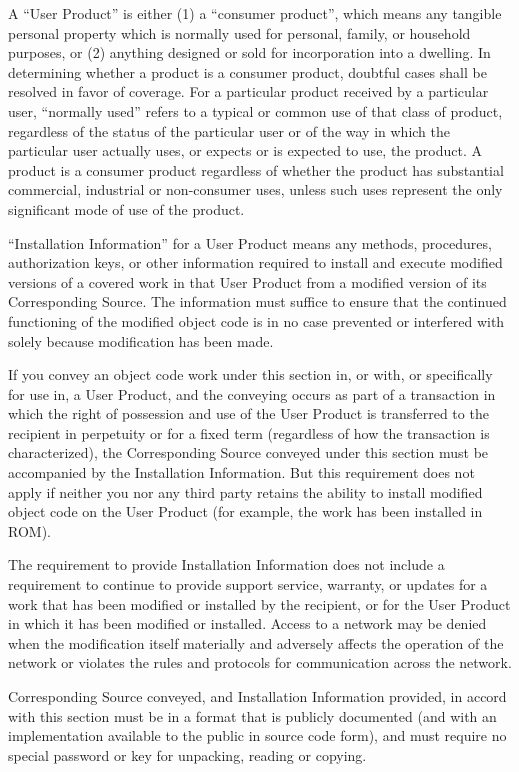 \begin{enumerate}
A ``User Product'' is either (1) a ``consumer product'', which means any
tangible personal property which is normally used for personal, family,
or household purposes, or (2) anything designed or sold for incorporation
into a dwelling.  In determining whether a product is a consumer product,
doubtful cases shall be resolved in favor of coverage.  For a particular
product received by a particular user, ``normally used'' refers to a
typical or common use of that class of product, regardless of the status
of the particular user or of the way in which the particular user
actually uses, or expects or is expected to use, the product.  A product
is a consumer product regardless of whether the product has substantial
commercial, industrial or non-consumer uses, unless such uses represent
the only significant mode of use of the product.

``Installation Information'' for a User Product means any methods,
procedures, authorization keys, or other information required to install
and execute modified versions of a covered work in that User Product from
a modified version of its Corresponding Source.  The information must
suffice to ensure that the continued functioning of the modified object
code is in no case prevented or interfered with solely because
modification has been made.

If you convey an object code work under this section in, or with, or
specifically for use in, a User Product, and the conveying occurs as
part of a transaction in which the right of possession and use of the
User Product is transferred to the recipient in perpetuity or for a
fixed term (regardless of how the transaction is characterized), the
Corresponding Source conveyed under this section must be accompanied
by the Installation Information.  But this requirement does not apply
if neither you nor any third party retains the ability to install
modified object code on the User Product (for example, the work has
been installed in ROM).

The requirement to provide Installation Information does not include a
requirement to continue to provide support service, warranty, or updates
for a work that has been modified or installed by the recipient, or for
the User Product in which it has been modified or installed.  Access to a
network may be denied when the modification itself materially and
adversely affects the operation of the network or violates the rules and
protocols for communication across the network.

Corresponding Source conveyed, and Installation Information provided,
in accord with this section must be in a format that is publicly
documented (and with an implementation available to the public in
source code form), and must require no special password or key for
unpacking, reading or copying.


\end{enumerate}

